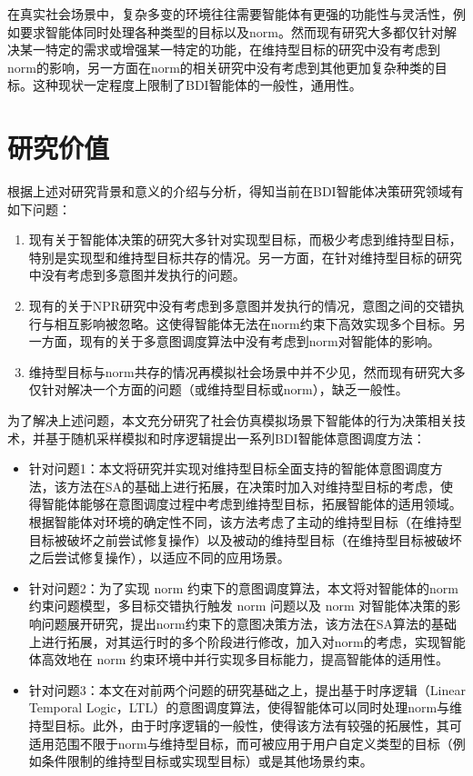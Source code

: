 在真实社会场景中，复杂多变的环境往往需要智能体有更强的功能性与灵活性，例如要求智能体同时处理各种类型的目标以及norm。然而现有研究大多都仅针对解决某一特定的需求或增强某一特定的功能，在维持型目标的研究中没有考虑到norm的影响，另一方面在norm的相关研究中没有考虑到其他更加复杂种类的目标。这种现状一定程度上限制了BDI智能体的一般性，通用性。
\section{研究价值}
根据上述对研究背景和意义的介绍与分析，得知当前在BDI智能体决策研究领域有如下问题：
\begin{enumerate}
  \item 现有关于智能体决策的研究大多针对实现型目标，而极少考虑到维持型目标，特别是实现型和维持型目标共存的情况。另一方面，在针对维持型目标的研究中没有考虑到多意图并发执行的问题。
  \item 现有的关于NPR研究中没有考虑到多意图并发执行的情况，意图之间的交错执行与相互影响被忽略。这使得智能体无法在norm约束下高效实现多个目标。另一方面，现有的关于多意图调度算法中没有考虑到norm对智能体的影响。
  \item 维持型目标与norm共存的情况再模拟社会场景中并不少见，然而现有研究大多仅针对解决一个方面的问题（或维持型目标或norm），缺乏一般性。
\end{enumerate}

%
为了解决上述问题，本文充分研究了社会仿真模拟场景下智能体的行为决策相关技术，并基于随机采样模拟和时序逻辑提出一系列BDI智能体意图调度方法：
\begin{itemize}
  \item
针对问题1：本文将研究并实现对维持型目标全面支持的智能体意图调度方法，该方法在SA的基础上进行拓展，在决策时加入对维持型目标的考虑，使得智能体能够在意图调度过程中考虑到维持型目标，拓展智能体的适用领域。根据智能体对环境的确定性不同，该方法考虑了主动的维持型目标（在维持型目标被破坏之前尝试修复操作）以及被动的维持型目标（在维持型目标被破坏之后尝试修复操作），以适应不同的应用场景。
  \item
针对问题2：为了实现 norm 约束下的意图调度算法，本文将对智能体的norm约束问题模型，多目标交错执行触发 norm 问题以及 norm 对智能体决策的影响问题展开研究，提出norm约束下的意图决策方法，该方法在SA算法的基础上进行拓展，对其运行时的多个阶段进行修改，加入对norm的考虑，实现智能体高效地在 norm 约束环境中并行实现多目标能力，提高智能体的适用性。
  \item
针对问题3：本文在对前两个问题的研究基础之上，提出基于时序逻辑（Linear Temporal Logic，LTL）的意图调度算法，使得智能体可以同时处理norm与维持型目标。此外，由于时序逻辑的一般性，使得该方法有较强的拓展性，其可适用范围不限于norm与维持型目标，而可被应用于用户自定义类型的目标（例如条件限制的维持型目标或实现型目标）或是其他场景约束。
\end{itemize}
%
